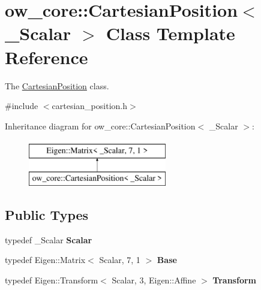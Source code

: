 \hypertarget{classow__core_1_1CartesianPosition}{}\section{ow\+\_\+core\+:\+:Cartesian\+Position$<$ \+\_\+\+Scalar $>$ Class Template Reference}
\label{classow__core_1_1CartesianPosition}


The \hyperlink{classow__core_1_1CartesianPosition}{Cartesian\+Position} class.  




{\ttfamily \#include $<$cartesian\+\_\+position.\+h$>$}

Inheritance diagram for ow\+\_\+core\+:\+:Cartesian\+Position$<$ \+\_\+\+Scalar $>$\+:\begin{figure}[H]
\begin{center}
\leavevmode
\includegraphics[height=2.000000cm]{d0/d5b/classow__core_1_1CartesianPosition}
\end{center}
\end{figure}
\subsection*{Public Types}
\begin{DoxyCompactItemize}
\item 
typedef \+\_\+\+Scalar {\bfseries Scalar}\hypertarget{classow__core_1_1CartesianPosition_a2d3bae7b8988a5956f61233244a8a038}{}\label{classow__core_1_1CartesianPosition_a2d3bae7b8988a5956f61233244a8a038}

\item 
typedef Eigen\+::\+Matrix$<$ Scalar, 7, 1 $>$ {\bfseries Base}\hypertarget{classow__core_1_1CartesianPosition_a51a56b2c4b9830555602ade3e777fdd8}{}\label{classow__core_1_1CartesianPosition_a51a56b2c4b9830555602ade3e777fdd8}

\item 
typedef Eigen\+::\+Transform$<$ Scalar, 3, Eigen\+::\+Affine $>$ {\bfseries Transform}\hypertarget{classow__core_1_1CartesianPosition_a9c129146a77674691e1c04fe79d142db}{}\label{classow__core_1_1CartesianPosition_a9c129146a77674691e1c04fe79d142db}

\end{DoxyCompactItemize}
